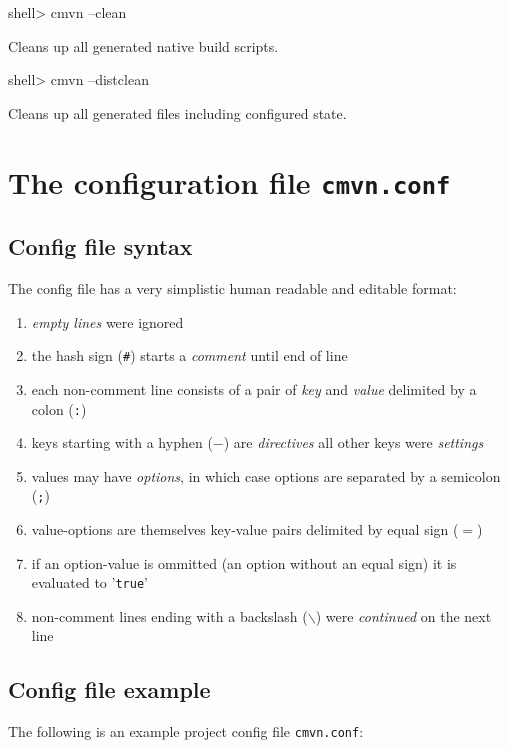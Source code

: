 \documentclass[a4paper,12pt,english,oneside,halfparskip]{scrartcl}
\newcommand{\code}[1]{\texttt{#1}}
\begin{document}
\begin{Cmdline}
shell> cmvn --clean
\end{Cmdline}

Cleans up all generated native build scripts.

\begin{Cmdline}
shell> cmvn --distclean
\end{Cmdline}

Cleans up all generated files including configured state.

\section{The configuration file \texttt{cmvn.conf}}

\subsection{Config file syntax}

The config file has a very simplistic human readable and editable format:

\begin{enumerate}
 \item \emph{empty lines} were ignored
 \item the hash sign (\code{\#}) starts a \emph{comment} until end of line
 \item each non-comment line consists of a pair of \emph{key} and \emph{value} delimited by a colon (\code{:})
 \item keys starting with a hyphen (\code{$-$}) are \emph{directives} all other keys were \emph{settings}
 \item values may have \emph{options}, in which case options are separated by a semicolon (\code{;})
 \item value-options are themselves key-value pairs delimited by equal sign (\code{$=$})
 \item if an option-value is ommitted (an option without an equal sign) it is evaluated to '\code{true}'
 \item non-comment lines ending with a backslash (\code{$\backslash$}) were \emph{continued} on the next line
\end{enumerate}

\subsection{Config file example}

The following is an example project config file \code{cmvn.conf}:
\end{document}
